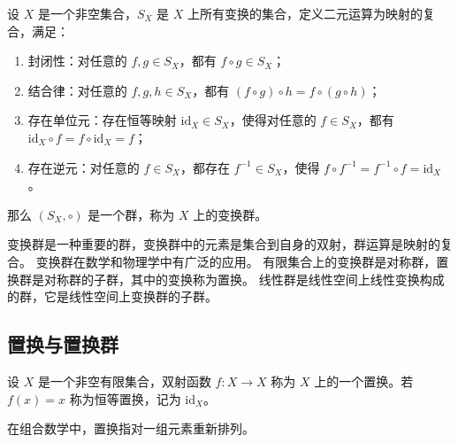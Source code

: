 \begin{definition}
    设 $X$ 是一个非空集合，$S_X$ 是 $X$ 上所有变换的集合，定义二元运算为映射的复合，满足：
    \begin{enumerate}
        \item 封闭性：对任意的 $f, g\in S_X$，都有 $f \circ g \in S_X$；
        \item 结合律：对任意的 $f, g, h\in S_X$，都有 $(f \circ g) \circ h = f \circ (g \circ h)$；
        \item 存在单位元：存在恒等映射 $\mathrm{id}_X\in S_X$，使得对任意的 $f\in S_X$，都有 $\mathrm{id}_X \circ f = f \circ \mathrm{id}_X = f$；
        \item 存在逆元：对任意的 $f\in S_X$，都存在 $f^{-1}\in S_X$，使得 $f \circ f^{-1} = f^{-1} \circ f = \mathrm{id}_X$。
    \end{enumerate}    
    那么 $(S_X, \circ)$ 是一个群，称为 $X$ 上的变换群。
\end{definition}

\begin{note}
    变换群是一种重要的群，变换群中的元素是集合到自身的双射，群运算是映射的复合。
    变换群在数学和物理学中有广泛的应用。
    有限集合上的变换群是对称群，置换群是对称群的子群，其中的变换称为置换。
    线性群是线性空间上线性变换构成的群，它是线性空间上变换群的子群。
\end{note}
\vspace{1em}

\vspace{1em}
\subsection{置换与置换群}
\begin{definition}[置换 Permutation]
    设 $X$ 是一个非空有限集合，双射函数 $f: X \to X$ 称为 $X$ 上的一个置换。若 $f(x)=x$ 称为恒等置换，记为 $\mathrm{id}_X$。
\end{definition}
\begin{note}
    在组合数学中，置换指对一组元素重新排列。
\end{note}


